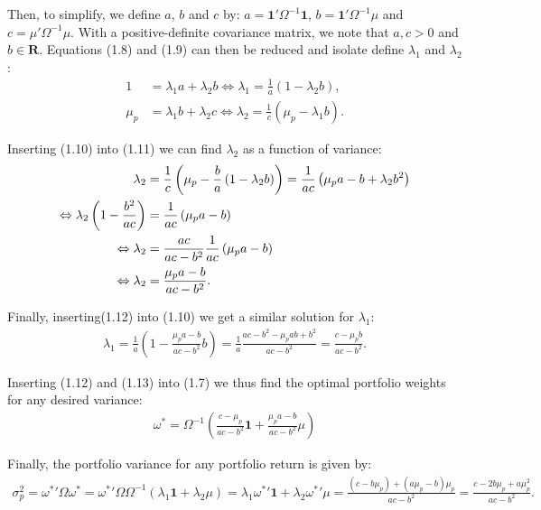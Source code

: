 \documentclass[11pt,a4paper,oneside]{article}
\newcommand{\LL}{\Leftrightarrow}
\newcommand{\lp}{\left(}
\newcommand{\rp}{\right)}
\newcommand{\rr}{\mathbf{R}}
\begin{document}
Then, to simplify, we define $a$, $b$ and $c$ by: $a = \mathbf{1}'\Omega^{-1} \mathbf{1}$, $b = \mathbf{1}'\Omega^{-1}\mu$ and $c = \mu'\Omega^{-1}\mu$. With a positive-definite covariance matrix, we note that $a, c > 0$ and $b \in \rr$. Equations (1.8) and (1.9) can then be reduced and isolate define $\lambda_1$ and $\lambda_2$:
\begin{align}
    1 &= \lambda_1 a + \lambda_2 b 
    \LL 
    \lambda_1  = \frac{1}{a}\lp 1 - \lambda_2 b\rp, \\
    \mu_p &= \lambda_1 b + \lambda_2 c
    \LL 
    \lambda_2 = \frac{1}{c}\lp \mu_p - \lambda_1 b\rp.
\end{align}

Inserting (1.10) into (1.11) we can find $\lambda_2$ as a function of variance:
\begin{align}
    \lambda_2 
        &= \frac{1}{c} \lp \mu_p - \frac{b}{a}\lp 1 - \lambda_2 b\rp\rp \notag 
         = \frac{1}{ac}\lp \mu_p a - b + \lambda_2 b^2 \rp \notag \\
    \LL \lambda_2 \lp 1 - \frac{b^2}{ac}\rp
        &= \frac{1}{ac}\lp \mu_p a - b\rp \notag \\
    \LL \lambda_2 
        &= \frac{ac}{ac - b^2}\frac{1}{ac}\lp \mu_p a - b\rp \notag \\
    \LL \lambda_2
        &= \frac{\mu_p a - b}{ac - b^2}.
\end{align}

Finally, inserting(1.12) into (1.10) we get a similar solution for $\lambda_1$:
\begin{align}
    \lambda_1
        = \frac{1}{a}\lp 1 - \frac{\mu_p a - b}{ac - b^2} b\rp = \frac{1}{a}\frac{ac - b^2 - \mu_p a b + b^2}{ac - b^2} = \frac{c - \mu_p b}{ac - b^2}.
\end{align}

Inserting (1.12) and (1.13) into (1.7) we thus find the optimal portfolio weights for any desired variance:
\begin{align}
    \omega^* = \Omega^{-1}\lp \frac{c - \mu_p}{ac - b^2} \mathbf{1} + \frac{\mu_p a - b}{ac - b^2} \mu\rp
\end{align}

Finally, the portfolio variance for any portfolio return is given by:
\begin{align}
    \sigma_p^2 = {\omega^*}'\Omega\omega^* = {\omega^*}' \Omega \Omega^{-1}\lp \lambda_1 \mathbf{1} + \lambda_2 \mu \rp = \lambda_1 {\omega^*}'\mathbf{1} + \lambda_2 {\omega^*}'\mu = \frac{\lp c - b \mu_p\rp + \lp a \mu_p - b\rp \mu_p}{ac - b^2} = \frac{c - 2b \mu_p + a \mu_p^2}{ac - b^2}.
\end{align}
\end{document}
